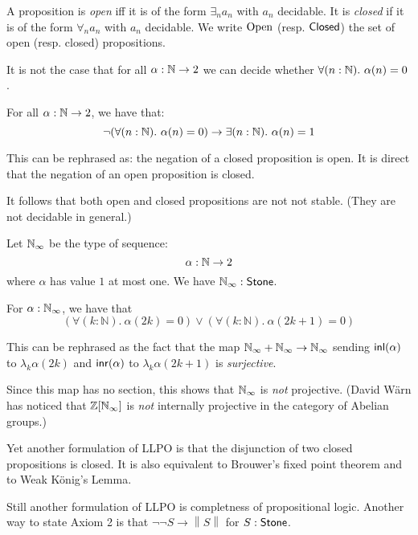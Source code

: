 \newcommand\norm[1]{\left\lVert #1 \right\rVert}


A proposition is {\em open} iff it is of the form $\exists_n a_n$ with $a_n$ decidable.
It is {\em closed} if it is of the form $\forall_n a_n$ with $a_n$ decidable.
We write $\mathrm{Open}$ (resp. $\mathsf{Closed}$) the set of open (resp. closed) propositions.


\begin{theorem}
   It is not the case that for all $\alpha:\mathbb{N}\to 2$ we can decide whether $\forall (n:\mathbb{N}).\ \alpha(n)=0$.
\end{theorem}

\begin{theorem}
  For all $\alpha:\mathbb{N}\to 2$, we have that:
   \[\neg(\forall (n:\mathbb{N}).\ \alpha(n)=0) \to \exists (n:\mathbb{N}).\ \alpha(n)=1\]
\end{theorem}

This can be rephrased as: the negation of a closed proposition is open. It is direct that the negation
of an open proposition is closed.

It follows that both open and closed propositions are not not stable. (They are not decidable in general.)

\begin{definition}
Let $\mathbb{N}_{\infty}$ be the type of sequence:
\[\alpha:\mathbb{N}\to 2\]
where $\alpha$ has value $1$ at most one. We have $\mathbb{N}_{\infty}:\mathsf{Stone}$.
\end{definition}

\begin{theorem}
  For $\alpha:\mathbb {\mathbb{N}_{\infty}}$, 
  we have that 
  \begin{equation}\label{eqnLLPO}
    \left(\forall (k:\mathbb N).\ \alpha(2k) = 0 \right) \vee \left(\forall (k:\mathbb N).\ \alpha(2k+1) = 0\right)
  \end{equation}
\end{theorem}

This can be rephrased as the fact that the map $\mathbb{N}_{\infty}+\mathbb{N}_{\infty}\rightarrow \mathbb{N}_{\infty}$ sending $\mathsf{inl}(\alpha)$ to $\lambda_k \alpha(2k)$
and $\mathsf{inr}(\alpha)$ to $\lambda_k \alpha(2k+1)$ is {\em surjective}.

\medskip

Since this map has no section, this shows that $\mathbb{N}_{\infty}$ is {\em not} projective.
(David W\"arn has noticed that $\mathbb{Z}[\mathbb{N}_{\infty}]$ is {\em not} internally projective in the category of
Abelian groups.)

\medskip

 Yet another formulation of LLPO is that the disjunction of two closed propositions is closed.
 It is also equivalent to Brouwer's fixed point theorem and to Weak K\"onig's Lemma.

Still another formulation of LLPO is completness of propositional logic. Another way to state
Axiom 2 is that $\neg\neg S\rightarrow \norm{S}$ for $S:\mathsf{Stone}$.


 

